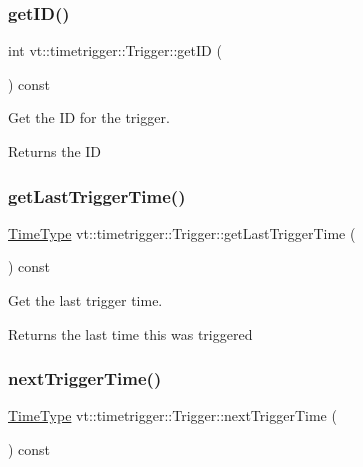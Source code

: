 \subsubsection{\texorpdfstring{get\+I\+D()}{getID()}}
{\footnotesize\ttfamily int vt\+::timetrigger\+::\+Trigger\+::get\+ID (\begin{DoxyParamCaption}{ }\end{DoxyParamCaption}) const\hspace{0.3cm}{\ttfamily [inline]}}



Get the ID for the trigger. 

\begin{DoxyReturn}{Returns}
the ID 
\end{DoxyReturn}
\mbox{\label{structvt_1_1timetrigger_1_1_trigger_a4065ece0b3f17ee3780b045e3520aaf5}} 
\subsubsection{\texorpdfstring{get\+Last\+Trigger\+Time()}{getLastTriggerTime()}}
{\footnotesize\ttfamily \hyperlink{namespacevt_a876a9d0cd5a952859c72de8a46881442}{Time\+Type} vt\+::timetrigger\+::\+Trigger\+::get\+Last\+Trigger\+Time (\begin{DoxyParamCaption}{ }\end{DoxyParamCaption}) const\hspace{0.3cm}{\ttfamily [inline]}}



Get the last trigger time. 

\begin{DoxyReturn}{Returns}
the last time this was triggered 
\end{DoxyReturn}
\mbox{\label{structvt_1_1timetrigger_1_1_trigger_a77c78026bc618f6084ecda2a3e0198ba}} 
\subsubsection{\texorpdfstring{next\+Trigger\+Time()}{nextTriggerTime()}}
{\footnotesize\ttfamily \hyperlink{namespacevt_a876a9d0cd5a952859c72de8a46881442}{Time\+Type} vt\+::timetrigger\+::\+Trigger\+::next\+Trigger\+Time (\begin{DoxyParamCaption}{ }\end{DoxyParamCaption}) const\hspace{0.3cm}{\ttfamily [inline]}}



